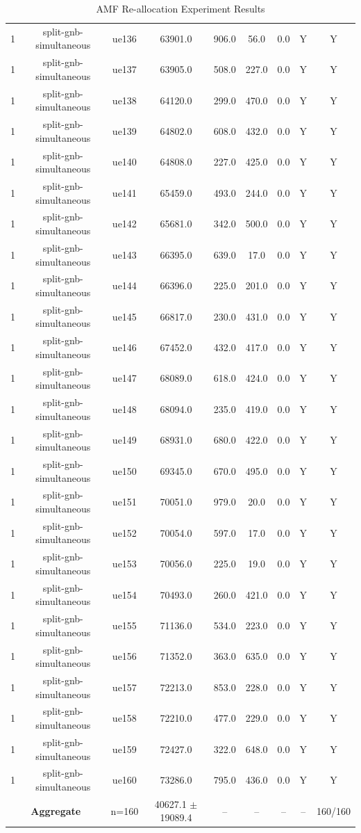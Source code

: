 \begin{table}[ht]
\begin{tabular}{|c|c|c|c|c|c|c|c|c|}
1 & split-gnb-simultaneous & ue136 & 63901.0 & 906.0 & 56.0 & 0.0 & Y & Y \\
1 & split-gnb-simultaneous & ue137 & 63905.0 & 508.0 & 227.0 & 0.0 & Y & Y \\
1 & split-gnb-simultaneous & ue138 & 64120.0 & 299.0 & 470.0 & 0.0 & Y & Y \\
1 & split-gnb-simultaneous & ue139 & 64802.0 & 608.0 & 432.0 & 0.0 & Y & Y \\
1 & split-gnb-simultaneous & ue140 & 64808.0 & 227.0 & 425.0 & 0.0 & Y & Y \\
1 & split-gnb-simultaneous & ue141 & 65459.0 & 493.0 & 244.0 & 0.0 & Y & Y \\
1 & split-gnb-simultaneous & ue142 & 65681.0 & 342.0 & 500.0 & 0.0 & Y & Y \\
1 & split-gnb-simultaneous & ue143 & 66395.0 & 639.0 & 17.0 & 0.0 & Y & Y \\
1 & split-gnb-simultaneous & ue144 & 66396.0 & 225.0 & 201.0 & 0.0 & Y & Y \\
1 & split-gnb-simultaneous & ue145 & 66817.0 & 230.0 & 431.0 & 0.0 & Y & Y \\
1 & split-gnb-simultaneous & ue146 & 67452.0 & 432.0 & 417.0 & 0.0 & Y & Y \\
1 & split-gnb-simultaneous & ue147 & 68089.0 & 618.0 & 424.0 & 0.0 & Y & Y \\
1 & split-gnb-simultaneous & ue148 & 68094.0 & 235.0 & 419.0 & 0.0 & Y & Y \\
1 & split-gnb-simultaneous & ue149 & 68931.0 & 680.0 & 422.0 & 0.0 & Y & Y \\
1 & split-gnb-simultaneous & ue150 & 69345.0 & 670.0 & 495.0 & 0.0 & Y & Y \\
1 & split-gnb-simultaneous & ue151 & 70051.0 & 979.0 & 20.0 & 0.0 & Y & Y \\
1 & split-gnb-simultaneous & ue152 & 70054.0 & 597.0 & 17.0 & 0.0 & Y & Y \\
1 & split-gnb-simultaneous & ue153 & 70056.0 & 225.0 & 19.0 & 0.0 & Y & Y \\
1 & split-gnb-simultaneous & ue154 & 70493.0 & 260.0 & 421.0 & 0.0 & Y & Y \\
1 & split-gnb-simultaneous & ue155 & 71136.0 & 534.0 & 223.0 & 0.0 & Y & Y \\
1 & split-gnb-simultaneous & ue156 & 71352.0 & 363.0 & 635.0 & 0.0 & Y & Y \\
1 & split-gnb-simultaneous & ue157 & 72213.0 & 853.0 & 228.0 & 0.0 & Y & Y \\
1 & split-gnb-simultaneous & ue158 & 72210.0 & 477.0 & 229.0 & 0.0 & Y & Y \\
1 & split-gnb-simultaneous & ue159 & 72427.0 & 322.0 & 648.0 & 0.0 & Y & Y \\
1 & split-gnb-simultaneous & ue160 & 73286.0 & 795.0 & 436.0 & 0.0 & Y & Y \\
\multicolumn{2}{|c|}{\textbf{Aggregate}} & n=160 & 40627.1 $\pm$ 19089.4 & -- & -- & -- & -- & 160/160 \\
\hline
\end{tabular}
\caption{AMF Re-allocation Experiment Results}
\label{tab:amf_realloc}
\end{table}
